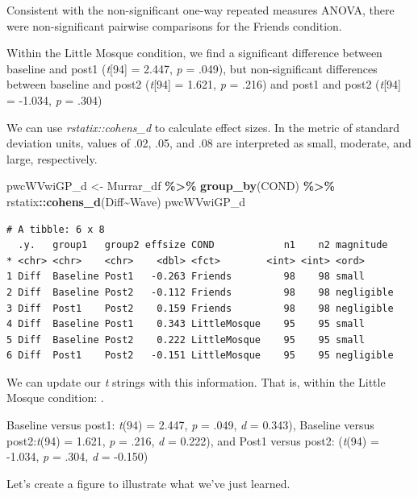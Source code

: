 \documentclass[
  11pt,
]{book}
\newenvironment{Shaded}{\begin{snugshade}}{\end{snugshade}}
\newcommand{\FunctionTok}[1]{\textcolor[rgb]{0.27,0.27,0.27}{\textbf{#1}}}
\newcommand{\NormalTok}[1]{#1}
\newcommand{\OtherTok}[1]{\textcolor[rgb]{0.37,0.37,0.37}{#1}}
\newcommand{\SpecialCharTok}[1]{\textcolor[rgb]{0.43,0.43,0.43}{\textbf{#1}}}
\begin{document}
Consistent with the non-significant one-way repeated measures ANOVA, there were non-significant pairwise comparisons for the Friends condition.

Within the Little Mosque condition, we find a significant difference between baseline and post1 (\emph{t}{[}94{]} = 2.447, \emph{p} = .049), but non-significant differences between baseline and post2 (\emph{t}{[}94{]} = 1.621, \emph{p} = .216) and post1 and post2 (\emph{t}{[}94{]} = -1.034, \emph{p} = .304)

We can use \emph{rstatix::cohens\_d} to calculate effect sizes. In the metric of standard deviation units, values of .02, .05, and .08 are interpreted as small, moderate, and large, respectively.

\begin{Shaded}
\begin{Highlighting}[]
\NormalTok{pwcWVwiGP\_d }\OtherTok{\textless{}{-}}\NormalTok{ Murrar\_df }\SpecialCharTok{\%\textgreater{}\%} 
  \FunctionTok{group\_by}\NormalTok{(COND) }\SpecialCharTok{\%\textgreater{}\%} 
\NormalTok{  rstatix}\SpecialCharTok{::}\FunctionTok{cohens\_d}\NormalTok{(Diff}\SpecialCharTok{\textasciitilde{}}\NormalTok{Wave)}
\NormalTok{pwcWVwiGP\_d }
\end{Highlighting}
\end{Shaded}

\begin{verbatim}
# A tibble: 6 x 8
  .y.   group1   group2 effsize COND            n1    n2 magnitude 
* <chr> <chr>    <chr>    <dbl> <fct>        <int> <int> <ord>     
1 Diff  Baseline Post1   -0.263 Friends         98    98 small     
2 Diff  Baseline Post2   -0.112 Friends         98    98 negligible
3 Diff  Post1    Post2    0.159 Friends         98    98 negligible
4 Diff  Baseline Post1    0.343 LittleMosque    95    95 small     
5 Diff  Baseline Post2    0.222 LittleMosque    95    95 small     
6 Diff  Post1    Post2   -0.151 LittleMosque    95    95 negligible
\end{verbatim}

We can update our \emph{t} strings with this information. That is, within the Little Mosque condition: .

Baseline versus post1: \emph{t}(94) = 2.447, \emph{p} = .049, \emph{d} = 0.343), Baseline versus post2:\emph{t}(94) = 1.621, \emph{p} = .216, \emph{d} = 0.222), and Post1 versus post2: (\emph{t}(94) = -1.034, \emph{p} = .304, \emph{d} = -0.150)

Let's create a figure to illustrate what we've just learned.
\end{document}
